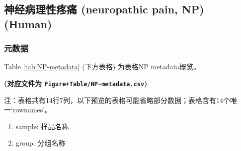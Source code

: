 \documentclass[
]{article}
\providecommand{\tightlist}{%
  \setlength{\itemsep}{0pt}\setlength{\parskip}{0pt}}
\begin{document}
\hypertarget{ux795eux7ecfux75c5ux7406ux6027ux75bcux75db-neuropathic-pain-np-human}{%
\subsection{神经病理性疼痛 (neuropathic pain, NP) (Human)}\label{ux795eux7ecfux75c5ux7406ux6027ux75bcux75db-neuropathic-pain-np-human}}

\hypertarget{ux5143ux6570ux636e-1}{%
\subsubsection{元数据}\label{ux5143ux6570ux636e-1}}

Table \ref{tab:NP-metadata} (下方表格) 为表格NP metadata概览。

\textbf{(对应文件为 \texttt{Figure+Table/NP-metadata.csv})}

\begin{center}\begin{tcolorbox}[colback=gray!10, colframe=gray!50, width=0.9\linewidth, arc=1mm, boxrule=0.5pt]注：表格共有14行7列，以下预览的表格可能省略部分数据；表格含有14个唯一`rownames'。
\end{tcolorbox}
\end{center}
\begin{center}\begin{tcolorbox}[colback=gray!10, colframe=gray!50, width=0.9\linewidth, arc=1mm, boxrule=0.5pt]\begin{enumerate}\tightlist
\item sample: 样品名称
\item group: 分组名称
\end{enumerate}\end{tcolorbox}
\end{center}
\end{document}
